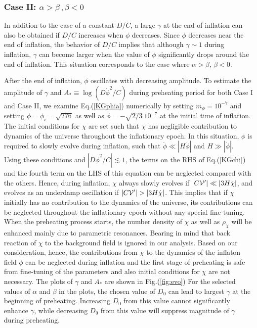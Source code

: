 \documentclass[aps,prd,amsmath,amssymb,preprintnumbers,onecolumn,11pt,nofootinbib]{revtex4}
\begin{document}
\subsubsection{{\rm Case II:} $\alpha > \beta\,,\beta<0$}
In addition to the case of a constant $D/C$, a large $\gamma$ at the end of inflation can also be obtained if $D/C$ increases when $\phi$ decreases.
Since $\phi$ decreases near the end of inflation,
the behavior of $D/C$ implies that although $\gamma \sim 1$ during inflation, $\gamma$ can become larger when the value of $\phi$ significantly drops around the end of inflation. This situation corresponds to the case where $\alpha > \beta$, $\beta<0$.

After the end of  inflation, $\dot\phi$ oscillates with decreasing amplitude.
To estimate the amplitude of $\gamma$ and $A_{*} \equiv \log(D \dot\phi^2 /C)$ during preheating period for both Case I and Case II,
we examine Eq.(\ref{KGphia}) numerically by setting $m_\phi = 10^{-7}$
and setting  $\phi = \phi_i = \sqrt{276}$ as well as $\dot\phi = - \sqrt{2/3} \,10^{-7}$ at the initial time of inflation. The initial conditions for $\chi$ are set such that $\chi$ has negligible contribution to dynamics of the universe  throughout the inflationary epoch.
In this situation, $\phi$ is required to slowly evolve during inflation, such that $\ddot\phi \ll |H \dot\phi|$ and $H \gg |\dot\phi|$.
Using these conditions and $|D \dot\phi^2 / C| \lesssim 1$,
the terms on the RHS of Eq.(\ref{KGchi}) and the fourth term on the LHS of this equation can be neglected compared with the others.
Hence, during inflation, $\chi$ always slowly evolves if $|C {\cal V}' | \ll |3 H \dot\chi|$,
and evolves as an underdamp oscillation if $|C {\cal V}' | > |3 H \dot\chi|$.
This implies that if $\chi$ initially has no contribution to the dynamics of the universe, its contributions can be neglected  throughout the inflationary epoch without  any special fine-tuning.
When the preheating process starts, the number density of $\chi$ as well as $\rho_\chi$ will be enhanced mainly due to parametric resonances. Bearing in mind that back reaction of $\chi$ to the background field is ignored in our analysis. Based on our consideration, hence, the contributions from $\chi$ to the dynamics of the inflaton field $\phi$ can be neglected during inflation and the first stage of preheating is safe from fine-tuning of the parameters and also initial conditions for $\chi$ are not necessary. The plots of $\gamma$ and $A_{*}$ are shown in Fig.(\ref{fig:evo})
For the selected values of $\alpha$ and $\beta$ in the plots, the chosen value of $D_0$ can lead to largest $\gamma$ at the beginning of preheating.
Increasing $D_0$ from this value cannot significantly enhance  $\gamma$,
while decreasing $D_0$ from this value will suppress magnitude of $\gamma$  during preheating.
\end{document}
